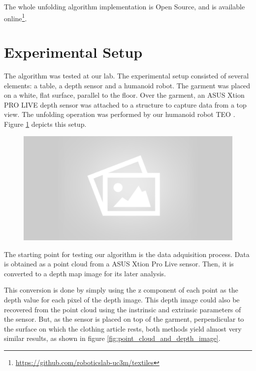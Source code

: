 The whole unfolding algorithm implementation is Open Source, and is available online\footnote{\url{https://github.com/roboticslab-uc3m/textiles}}.

\section{Experimental Setup}
\label{experiments:expermimental_setup}

The algorithm was tested at our lab. The experimental setup consisted of several elements: a table, a depth sensor and a humanoid robot. The garment was placed on a white, flat surface, parallel to the floor. Over the garment, an ASUS Xtion PRO LIVE depth sensor was attached to a structure to capture data from a top view. The unfolding operation was performed by our humanoid robot TEO \cite{martinez2012teo}. Figure \ref{fig:experimental_setup} depicts this setup.

\comment{[...]}

\begin{figure}[thpb]
    \centering
    \includegraphics[width=0.7
    \textwidth]{figures/placeholder2.png}
    \caption{}
    \label{fig:experimental_setup}
\end{figure}

The starting point for testing our algorithm is the data adquisition process. Data is obtained as a point cloud from a ASUS Xtion Pro Live sensor. Then, it is converted to a depth map image for its later analysis. 

This conversion is done by simply using the z component of each point as the depth value for each pixel of the depth image. This depth image could also be recovered from the point cloud using the instrinsic and extrinsic parameters of the sensor. But, as the sensor is placed on top of the garment, perpendicular to the surface on which the clothing article rests, both methods yield almost very similar results, as shown in figure \ref{fig:point_cloud_and_depth_image}.

